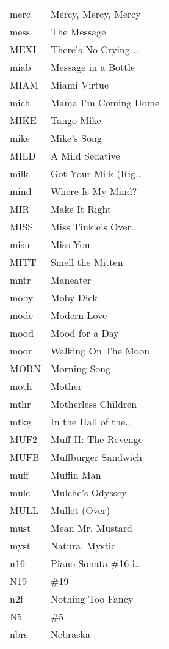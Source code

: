 \begin{supertabular}{ll}
 merc &   Mercy, Mercy, Mercy \\
 mess &           The Message \\
 MEXI &  There's No Crying .. \\
 miab &   Message in a Bottle \\
 MIAM &          Miami Virtue \\
 mich &  Mama I'm Coming Home \\
 MIKE &            Tango Mike \\
 mike &           Mike's Song \\
 MILD &       A Mild Sedative \\
 milk &  Got Your Milk (Rig.. \\
 mind &     Where Is My Mind? \\
  MIR &         Make It Right \\
 MISS &  Miss Tinkle's Over.. \\
 misu &              Miss You \\
 MITT &      Smell the Mitten \\
 mntr &              Maneater \\
 moby &             Moby Dick \\
 mode &           Modern Love \\
 mood &        Mood for a Day \\
 moon &   Walking On The Moon \\
 MORN &          Morning Song \\
 moth &                Mother \\
 mthr &   Motherless Children \\
 mtkg &  In the Hall of the.. \\
 MUF2 &  Muff II: The Revenge \\
 MUFB &   Muffburger Sandwich \\
 muff &            Muffin Man \\
 mulc &      Mulche's Odyssey \\
 MULL &         Mullet (Over) \\
 must &      Mean Mr. Mustard \\
 myst &        Natural Mystic \\
  n16 &  Piano Sonata \#16 i.. \\
  N19 &                   \#19 \\
  n2f &     Nothing Too Fancy \\
   N5 &                    \#5 \\
 nbrs &              Nebraska \\

\end{supertabular}
